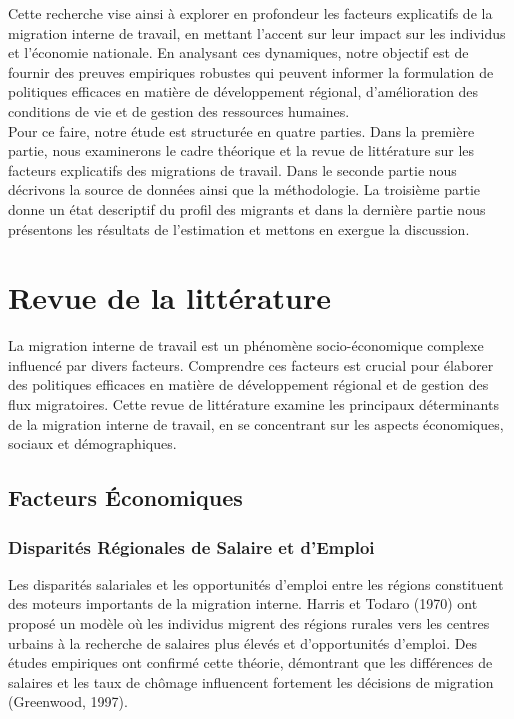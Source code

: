 \documentclass[a4paper,12pt]{article}
\begin{document}
Cette recherche vise ainsi à explorer en profondeur les facteurs explicatifs de la migration interne de travail, en mettant l'accent sur leur impact sur les individus et l'économie nationale. En analysant ces dynamiques, notre objectif est de fournir des preuves empiriques robustes qui peuvent informer la formulation de politiques efficaces en matière de développement régional, d'amélioration des conditions de vie et de gestion des ressources humaines.\\

Pour ce faire, notre étude est structurée en quatre parties. Dans la première partie, nous examinerons le cadre théorique et la revue de littérature sur les facteurs explicatifs des migrations de travail. Dans le seconde partie nous décrivons la source de données ainsi que la méthodologie. La troisième partie donne un état descriptif du profil des migrants et dans la dernière partie nous présentons les résultats de l'estimation et mettons en exergue la discussion. 

\section{Revue de la littérature}

La migration interne de travail est un phénomène socio-économique complexe influencé par divers facteurs. Comprendre ces facteurs est crucial pour élaborer des politiques efficaces en matière de développement régional et de gestion des flux migratoires. Cette revue de littérature examine les principaux déterminants de la migration interne de travail, en se concentrant sur les aspects économiques, sociaux et démographiques.


\subsection{Facteurs Économiques}

\subsubsection{Disparités Régionales de Salaire et d'Emploi}

Les disparités salariales et les opportunités d'emploi entre les régions constituent des moteurs importants de la migration interne. Harris et Todaro (1970) ont proposé un modèle où les individus migrent des régions rurales vers les centres urbains à la recherche de salaires plus élevés et d'opportunités d'emploi. Des études empiriques ont confirmé cette théorie, démontrant que les différences de salaires et les taux de chômage influencent fortement les décisions de migration (Greenwood, 1997).
\end{document}
